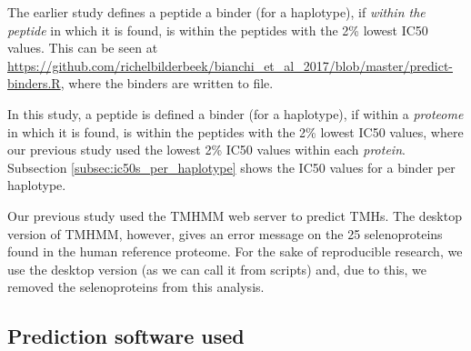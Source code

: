 
The earlier study defines a peptide a binder (for a haplotype), 
if \emph{within the peptide} in which it is found, 
is within the peptides with the 2\% lowest IC50 values.
This can be seen at \url{https://github.com/richelbilderbeek/bianchi_et_al_2017/blob/master/predict-binders.R},
where the binders are written to file.

In this study, a peptide is defined a binder (for a haplotype), 
if within a \emph{proteome} in which it is found, 
is within the peptides with the 2\% lowest IC50 values,
where our previous study used the lowest 2\% IC50 values
within each \emph{protein}.
Subsection \ref{subsec:ic50s_per_haplotype} shows the IC50 values
for a binder per haplotype.


Our previous study used the TMHMM web server
to predict TMHs.
The desktop version of TMHMM, however, gives an
error message on the 25 selenoproteins found in the human
reference proteome.
For the sake of reproducible research, we use the desktop version (as
we can call it from scripts) and, due to this, we removed the
selenoproteins from this analysis.

\subsection{Prediction software used}
\label{subsec:prediction_software_used}

